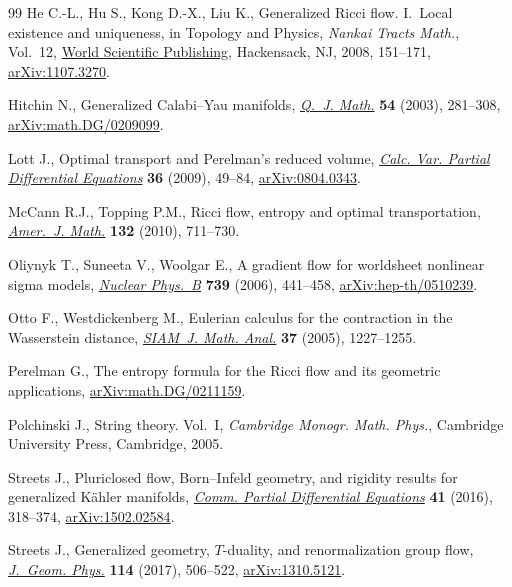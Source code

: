 \documentclass[pdftex]{sigma}
\numberwithin{equation}{section}
\begin{document}
\begin{thebibliography}{99}
He C.-L., Hu S., Kong D.-X., Liu K., Generalized {R}icci flow. {I}.~{L}ocal
 existence and uniqueness, in Topology and {P}hysics, \textit{Nankai Tracts
 Math.}, Vol.~12, \href{https://doi.org/10.1142/9789812819116_0006}{World Scientific Publishing}, Hackensack, NJ, 2008, 151--171,
 \href{https://arxiv.org/abs/1107.3270}{arXiv:1107.3270}.

Hitchin N., Generalized {C}alabi--{Y}au manifolds, \href{https://doi.org/10.1093/qjmath/54.3.281}{\textit{Q.~J. Math.}}
 \textbf{54} (2003), 281--308, \href{https://arxiv.org/abs/math.DG/0209099}{arXiv:math.DG/0209099}.

Lott J., Optimal transport and {P}erelman's reduced volume, \href{https://doi.org/10.1007/s00526-009-0223-8}{\textit{Calc. Var.
 Partial Differential Equations}} \textbf{36} (2009), 49--84,
 \href{https://arxiv.org/abs/0804.0343}{arXiv:0804.0343}.

McCann R.J., Topping P.M., Ricci flow, entropy and optimal transportation,
 \href{https://doi.org/10.1353/ajm.0.0110}{\textit{Amer.~J. Math.}} \textbf{132} (2010), 711--730.

Oliynyk T., Suneeta V., Woolgar E., A gradient flow for worldsheet nonlinear
 sigma models, \href{https://doi.org/10.1016/j.nuclphysb.2006.01.036}{\textit{Nuclear Phys.~B}} \textbf{739} (2006), 441--458,
 \href{https://arxiv.org/abs/hep-th/0510239}{arXiv:hep-th/0510239}.

Otto F., Westdickenberg M., Eulerian calculus for the contraction in the
 {W}asserstein distance, \href{https://doi.org/10.1137/050622420}{\textit{SIAM~J. Math. Anal.}} \textbf{37} (2005),
 1227--1255.

Perelman G., The entropy formula for the {R}icci flow and its geometric
 applications, \href{https://arxiv.org/abs/math.DG/0211159}{arXiv:math.DG/0211159}.

Polchinski J., String theory. {V}ol.~{I}, \textit{Cambridge Monogr. Math. Phys.},
 Cambridge University Press, Cambridge, 2005.

Streets J., Pluriclosed flow, {B}orn--{I}nfeld geometry, and rigidity results
 for generalized {K}\"ahler manifolds, \href{https://doi.org/10.1080/03605302.2015.1116560}{\textit{Comm. Partial Differential
 Equations}} \textbf{41} (2016), 318--374, \href{https://arxiv.org/abs/1502.02584}{arXiv:1502.02584}.

Streets J., Generalized geometry, {$T$}-duality, and renormalization group
 flow, \href{https://doi.org/10.1016/j.geomphys.2016.12.017}{\textit{J.~Geom. Phys.}} \textbf{114} (2017), 506--522,
 \href{https://arxiv.org/abs/1310.5121}{arXiv:1310.5121}.


\end{thebibliography}
\end{document}
